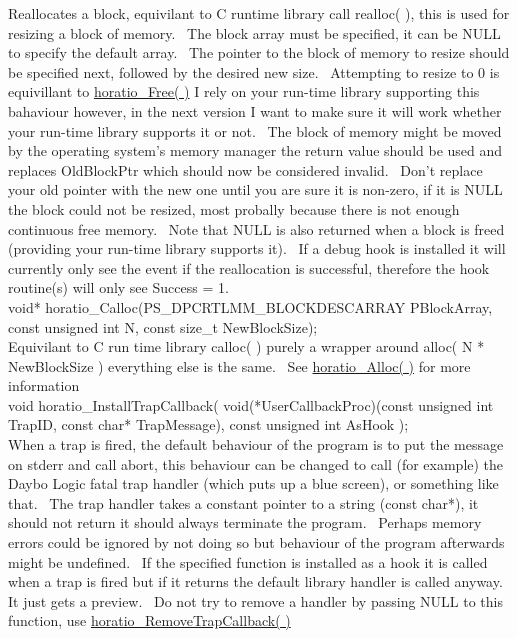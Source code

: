 \documentclass{article}
\begin{document}
Reallocates a block, equivilant to C runtime library call realloc(
), this is used for resizing a block of memory.~ The block array
must
be specified, it can be NULL to specify the default array.~ The
pointer
to the block of memory to resize should be specified next, followed by
the desired new size.~ Attempting to resize to 0 is equivillant to
\href{#Free}{horatio\_Free(
)} I rely on your run-time library supporting this bahaviour
however,
in the next version I want to make sure it will work whether your
run-time
library supports it or not.~ The block of memory might be moved by
the operating system's memory manager the return value should be used
and
replaces OldBlockPtr which should now be considered invalid.~
Don't
replace your old pointer with the new one until you are sure it is
non-zero,
if it is NULL the block could not be resized, most probally because
there
is not enough continuous free memory.~ Note that NULL is also
returned
when a block is freed (providing your run-time library supports
it).~
If a debug hook is installed it will currently only see the event if
the
reallocation is successful, therefore the hook routine(s) will only see
Success = 1.
\\
void* horatio\_Calloc(PS\_DPCRTLMM\_BLOCKDESCARRAY
PBlockArray, const unsigned int N, const size\_t NewBlockSize);
\\
Equivilant to C run time library calloc( ) purely a wrapper around
alloc( N * NewBlockSize ) everything else is the same.~ See \href{#Alloc}{horatio\_Alloc(
)} for more information
\\
void horatio\_InstallTrapCallback(
void(*UserCallbackProc)(const
unsigned int TrapID, const char* TrapMessage), const unsigned int
AsHook
);
\\
When a trap is fired, the default behaviour of the program is to put
the message on stderr and call abort, this behaviour can be changed to
call (for example) the Daybo Logic fatal trap handler (which puts up a
blue screen), or something like that.~ The trap handler takes a
constant
pointer to a string (const char*), it should not return it should
always
terminate the program.~ Perhaps memory errors could be ignored by
not doing so but behaviour of the program afterwards might be
undefined.~
If the specified function is installed as a hook it is called when a
trap
is fired but if it returns the default library handler is called
anyway.~
It just gets a preview.~ Do not try to remove a handler by passing
NULL to this function, use \href{#RemoveTrapCallback}{horatio\_RemoveTrapCallback(
)}
\\
\end{document}
